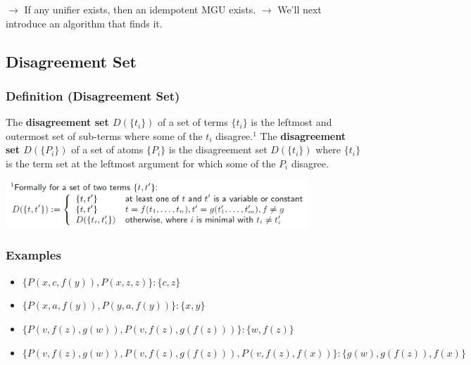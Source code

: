 \documentclass[conference, a4paper]{styles/acmsiggraph}
\begin{document}
        $\rightarrow$ If any unifier exists, then an idempotent MGU exists.\newline
        $\rightarrow$ We'll next introduce an algorithm that finds it.
        
    \subsection{Disagreement Set}
        \subsubsection{Definition (Disagreement Set)}
            The \textbf{disagreement set $D(\{t_i\})$} of a set of terms $\{t_i\}$ is the leftmost and outermost set of sub-terms where some of the $t_i$ disagree.$^1$\newline
            The \textbf{disagreement set $D(\{P_i\})$} of a set of atoms $\{P_i\}$ is the disagreement set $D(\{t_i\})$ where $\{t_i\}$ is the term set at the leftmost argument for which some of the $P_i$ disagree.
        
        \includegraphics[width=0.85\textwidth]{imgs/DisagreementSet.png}
        
        \subsubsection{Examples}
            \begin{itemize}
                \item $\{P(x,c,f(y)),P(x,z,z)\}: \{c,z\}$
                \item $\{P(x,a,f(y)),P(y,a,f(y))\}: \{x,y\}$
                \item $\{P(v,f(z),g(w)),P(v,f(z),g(f(z)))\}: \{w,f(z)\}$
                \item $\{P(v,f(z),g(w)),P(v,f(z),g(f(z))),P(v,f(z),f(x))\}: \{g(w),g(f(z)),f(x)\}$
            \end{itemize}

\newpage
\end{document}
